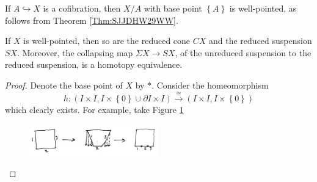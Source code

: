 \begin{example}[]
    If $A \hookrightarrow X$ is a cofibration, then
    $X / A$ with base point $\left\{ A \right\} $ is well-pointed,
    as follows from Theorem \ref{Thm:SJJDHW29WW}.
\end{example}

\begin{theorem}[]
    If $X$ is well-pointed, then so are the reduced
    cone $CX$ and the reduced suspension $SX$. Moreover,
    the collapsing map  $\Sigma X \to SX$, of the unreduced
    suspension to the reduced suspension, is a homotopy
    equivalence.
\end{theorem}

\begin{proof}
    Denote the base point of $X$ by $*$.
    Consider the homeomorphism
    \[
    h \colon \left( I \times I,
    I \times \left\{ 0 \right\} \cup 
\partial I \times I \right) 
\stackrel{\cong}{\to} \left( I \times I, I \times 
\left\{ 0 \right\} \right) 
    \] 
    which clearly exists. For example, take Figure
    \ref{fig:IWIDK01-jpeg}
    \begin{figure}[htpb]
        \centering
        \includegraphics[width=0.5\textwidth]{Figures/IWIDK01.jpeg}
        \caption{}
        \label{fig:IWIDK01-jpeg}
    \end{figure}


\end{proof}
